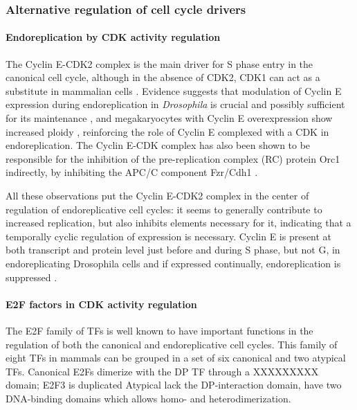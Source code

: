 \documentclass[11pt,twoside,a4paper]{report}
\begin{document}
			\subsubsection{Alternative regulation of cell cycle drivers}
			
				\paragraph{Endoreplication by CDK activity regulation}
			
				The Cyclin E-CDK2 complex is the main driver for S phase entry in the canonical cell cycle, although in the absence of CDK2, CDK1 can act as a substitute in mammalian cells \cite{Ullah2009}. Evidence suggests that modulation of Cyclin E expression during endoreplication in \textit{Drosophila} is crucial and possibly sufficient for its maintenance \cite{Lilly2005}, and megakaryocytes with Cyclin E overexpression show increased ploidy \cite{Eliades2010}, reinforcing the role of Cyclin E complexed with a CDK in endoreplication. The Cyclin E-CDK complex has also been shown to be responsible for the inhibition of the pre-replication complex (RC) protein Orc1 indirectly, by inhibiting the APC/C component Fzr/Cdh1 \cite{Narbonne-Reveau2008}.
			
				All these observations put the Cyclin E-CDK2 complex in the center of regulation of endoreplicative cell cycles: it seems to generally contribute to increased replication, but also inhibits elements necessary for it, indicating that a temporally cyclic regulation of expression is necessary. Cyclin E is present at both transcript and protein level just before and during S phase, but not G, in endoreplicating Drosophila cells \cite{Weng2003} and if expressed continually, endoreplication is suppressed \cite{Weiss}.
			
				\paragraph{E2F factors in CDK activity regulation}
				\label{paragraph:E2Fs}
			
				 The E2F family of TFs is well known to have important functions in the regulation of both the canonical and endoreplicative cell cycles. This family of eight TFs in mammals can be grouped in a set of six canonical and two atypical TFs.
				 Canonical E2Fs dimerize with the DP TF through a XXXXXXXXX domain; E2F3 is duplicated
				 Atypical lack the DP-interaction domain, have two DNA-binding domains which allows homo- and heterodimerization.
							
\end{document}
